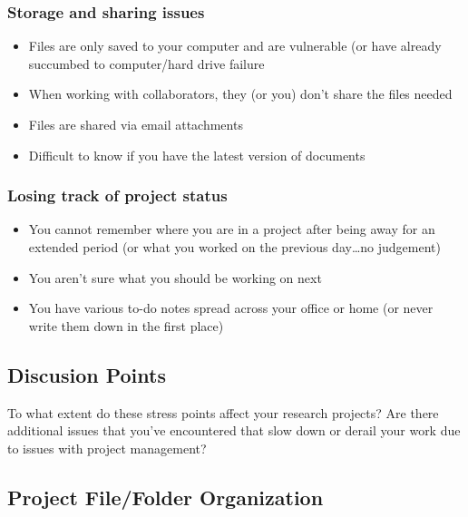 \documentclass[
]{article}
\providecommand{\tightlist}{%
  \setlength{\itemsep}{0pt}\setlength{\parskip}{0pt}}
\begin{document}
\hypertarget{storage-and-sharing-issues}{%
\subsubsection{Storage and sharing
issues}\label{storage-and-sharing-issues}}

\begin{itemize}
\tightlist
\item
  Files are only saved to your computer and are vulnerable (or have
  already succumbed to computer/hard drive failure
\item
  When working with collaborators, they (or you) don't share the files
  needed
\item
  Files are shared via email attachments
\item
  Difficult to know if you have the latest version of documents
\end{itemize}

\hypertarget{losing-track-of-project-status}{%
\subsubsection{Losing track of project
status}\label{losing-track-of-project-status}}

\begin{itemize}
\tightlist
\item
  You cannot remember where you are in a project after being away for an
  extended period (or what you worked on the previous day\ldots no
  judgement)
\item
  You aren't sure what you should be working on next
\item
  You have various to-do notes spread across your office or home (or
  never write them down in the first place)
\end{itemize}

\hypertarget{discusion-points}{%
\subsection{Discusion Points}\label{discusion-points}}

To what extent do these stress points affect your research projects? Are
there additional issues that you've encountered that slow down or derail
your work due to issues with project management?

\hypertarget{project-filefolder-organization}{%
\subsection{Project File/Folder
Organization}\label{project-filefolder-organization}}
\end{document}
